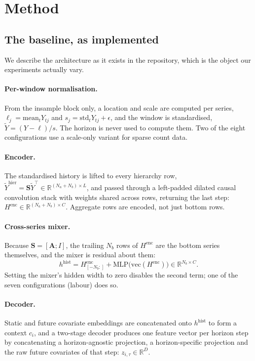 \documentclass[11pt]{article}
\newcommand{\Nb}{N_{b}}
\newcommand{\Na}{N_{a}}
\newcommand{\Smat}{\mathbf{S}}
\newcommand{\Real}{\mathbb{R}}
\begin{document}
\section{Method}
\label{sec:method}

\subsection{The baseline, as implemented}
We describe the architecture as it exists in the repository, which is the object our
experiments actually vary.

\paragraph{Per-window normalisation.} From the insample block only, a location and
scale are computed per series, $\ell_j = \mathrm{mean}_t Y_{tj}$ and
$s_j = \mathrm{std}_t Y_{tj} + \epsilon$, and the window is standardised,
$\tilde{Y} = (Y - \ell)/s$. The horizon is never used to compute them. Two of the
eight configurations use a scale-only variant for sparse count data.

\paragraph{Encoder.} The standardised history is lifted to every hierarchy row,
$\tilde{Y}^{\mathrm{hier}} = \Smat \tilde{Y}^{\!\top} \in \Real^{(\Na+\Nb) \times L}$,
and passed through a left-padded dilated causal convolution stack with weights shared
across rows, returning the last step: $H^{\mathrm{enc}} \in \Real^{(\Na+\Nb)\times C}$.
Aggregate rows are encoded, not just bottom rows.

\paragraph{Cross-series mixer.} Because $\Smat = [\mathbf{A}; I]$, the trailing $\Nb$
rows of $H^{\mathrm{enc}}$ are the bottom series themselves, and the mixer is residual
about them:
\begin{equation}
h^{\mathrm{hist}} = H^{\mathrm{enc}}_{[-\Nb:]}
+ \mathrm{MLP}\bigl(\mathrm{vec}(H^{\mathrm{enc}})\bigr)
\in \Real^{\Nb \times C}.
\end{equation}
Setting the mixer's hidden width to zero disables the second term; one of the seven
configurations (labour) does so.

\paragraph{Decoder.} Static and future covariate embeddings are concatenated onto
$h^{\mathrm{hist}}$ to form a context $c_i$, and a two-stage decoder produces one
feature vector per horizon step by concatenating a horizon-agnostic projection, a
horizon-specific projection and the raw future covariates of that step:
$z_{i,\tau} \in \Real^{D}$.
\end{document}
